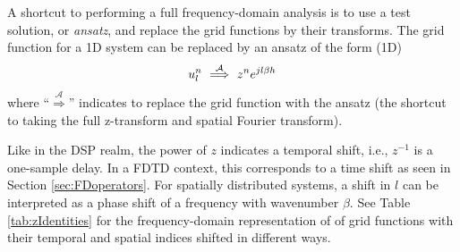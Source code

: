 A shortcut to performing a full frequency-domain analysis is to use a test solution, or \textit{ansatz}, and replace the grid functions by their transforms. The grid function for a 1D system can be replaced by an ansatz of the form (1D) \cite{Strikwerda1989}
\begin{equation}\label{eq:ansatz}
    u_l^n \ \overset{\mathcal{A}}{\Longrightarrow}\  z^n e^{jl\beta h}
\end{equation} 
where ``$\overset{\mathcal{A}}{\Longrightarrow}$'' indicates to replace the grid function with the ansatz (the shortcut to taking the full z-transform and spatial Fourier transform). 

Like in the DSP realm, the power of $z$ indicates a temporal shift, i.e., $z^{-1}$ is a one-sample delay. In a FDTD context, this corresponds to a time shift as seen in Section \ref{sec:FDoperators}. For spatially distributed systems, a shift in $l$ can be interpreted as a phase shift of a frequency with wavenumber $\beta$.  See Table \ref{tab:zIdentities} for the frequency-domain representation of of grid functions with their temporal and spatial indices shifted in different ways. 


